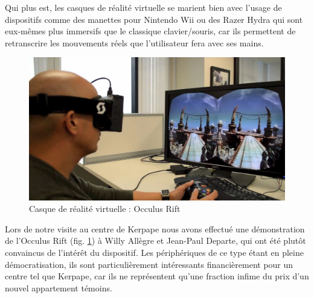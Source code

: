 Qui plus est, les casques de réalité virtuelle se marient bien avec l'usage de dispositifs comme des manettes pour Nintendo Wii ou des Razer Hydra qui sont eux-mêmes plus immersifs que le classique clavier/souris, car ils permettent de retranscrire les mouvements réels que l'utilisateur fera avec ses mains. \newline
\begin{figure}
  \centering
  \includegraphics[scale=0.3]{2-Specifications/img-utilisateur/occulus.jpg}
	\caption{Casque de réalité virtuelle : Occulus Rift}
	\label{occulus_reparo}
\end{figure}
Lors de notre visite au centre de Kerpape nous avons effectué une démonstration de l'Occulus Rift (fig. \ref{occulus_reparo}) à Willy Allègre et Jean-Paul Departe, qui ont été plutôt convaincus de l'intérêt du dispositif. 
Les périphériques de ce type étant en pleine démocratisation, ils sont particulièrement intéressants financièrement pour un centre tel que Kerpape, car ils ne représentent qu'une fraction infime du prix d'un nouvel appartement témoins.

